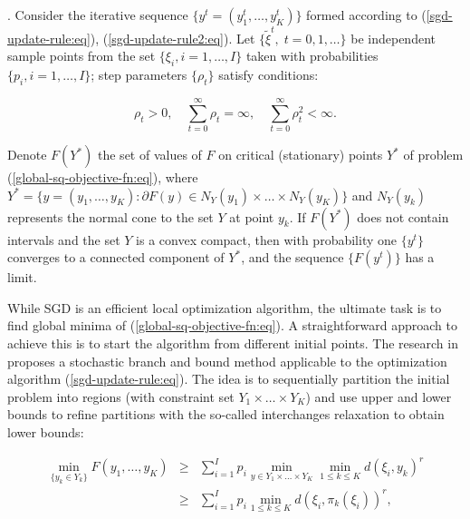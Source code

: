\begin{theorem}
    \label{Theorem 1}
    \cite{Ermoliev_Norkin_2003,Ermolev_Norkin_1998}. Consider the iterative sequence $\{ y^t = (y_1^t, \ldots, y_K^t) \}$ formed according to (\ref{sgd-update-rule:eq}), (\ref{sgd-update-rule2:eq}). Let $\{ \tilde{\xi}^t,\;t=0,1,\ldots\}$ be independent sample points from the set $\{ \xi_i, i = 1, \ldots, I \}$ taken with probabilities $\{ p_i, i = 1, \ldots, I \}$; step parameters $\{\rho_t\}$ satisfy conditions:

    \begin{equation}
        \label{sq-convergence-cond:eq}
        \rho_t > 0, \quad \sum_{t=0}^{\infty} \rho_t = \infty, \quad \sum_{t=0}^{\infty} \rho_t^2 < \infty.
    \end{equation}

    Denote $F(Y^{*})$ the set of values of $F$ on critical (stationary) points $Y^{*}$ of problem (\ref{global-sq-objective-fn:eq}), where $Y^{*} = \{ y = (y_1, \ldots, y_K): \partial F(y) \in N_Y (y_1) \times \ldots \times N_Y (y_K) \}$ and $N_Y (y_k)$ represents the normal cone to the set $Y$ at point $y_k$. If $F(Y^{*})$ does not contain intervals and the set $Y$ is a convex compact, then with probability one $\{ y^t \}$ converges to a connected component of $Y^{*}$, and the sequence $\{ F(y^t) \}$ has a limit.
\end{theorem}

While SGD is an efficient local optimization algorithm, the ultimate task is to find global minima of (\ref{global-sq-objective-fn:eq}). A straightforward approach to achieve this is to start the algorithm from different initial points. The research in \cite{Norkin_Pflug_Ruszczynski_1998} proposes a stochastic branch and bound method applicable to the optimization algorithm (\ref{sgd-update-rule:eq}). The idea is to sequentially partition the initial problem into regions (with constraint set $Y_1 \times \ldots \times Y_K$) and use upper and lower bounds to refine partitions with the so-called interchanges relaxation to obtain lower bounds:

\begin{eqnarray}
    \label{sq-branch-bound:eq}
    \min_{\{ y_k \in Y_k \}} F(y_1, \ldots, y_K)
    &\geq& \sum_{i=1}^I p_i \min_{y \in Y_1\times\ldots\times Y_K} \min_{1 \leq k \leq K} d(\xi_i, y_k)^r \nonumber\\
    &\geq& \sum_{i=1}^I p_i \min_{1 \leq k \leq K} d(\xi_i, \pi_k(\xi_i))^r, 
\end{eqnarray}

